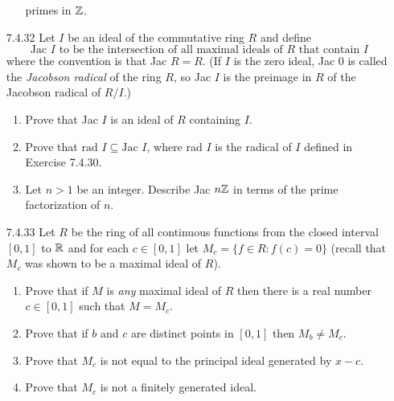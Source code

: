 \begin{enumerate}
\begin{enumerate}
                           primes in $\mathbb{Z}$.
                  \end{enumerate}
   \item[7.4.32]  Let $I$ be an ideal of the commutative ring $R$ and define
                  $$\text{Jac $I$ to be the intersection of all maximal ideals
                     of $R$ that contain $I$}$$
                  where the convention is that Jac $R = R$. (If $I$ is the zero
                  ideal, Jac 0 is called the \textit{Jacobson radical} of the
                  ring $R$, so Jac $I$ is the preimage in $R$ of the Jacobson
                  radical of $R/I$.)
                  \begin{enumerate}
                     \item Prove that Jac $I$ is an ideal of $R$ containing $I$.
                     \item Prove that $\text{rad } I \subseteq \text{Jac }I$,
                           where rad $I$ is the radical of $I$ defined in
                           Exercise 7.4.30.
                     \item Let $n > 1$ be an integer. Describe Jac $n\mathbb{Z}$ in
                           terms of the prime factorization of $n$.
                  \end{enumerate}
   \item[7.4.33]  Let $R$ be the ring of all continuous functions from the
                  closed interval $[0, 1]$ to $\mathbb{R}$ and for each $c \in [0, 1]$
                  let $M_c = \{f \in R : f(c) = 0\}$ (recall that $M_c$ was
                  shown to be a maximal ideal of $R$).
                  \begin{enumerate}
                     \item Prove that if $M$ is \textit{any} maximal ideal of
                           $R$ then there is a real number $c \in [0, 1]$ such
                           that $M = M_c$.
                     \item Prove that if $b$ and $c$ are distinct points in
                           $[0, 1]$ then $M_b \neq M_c$.
                     \item Prove that $M_c$ is not equal to the principal ideal
                           generated by $x - c$.
                     \item Prove that $M_c$ is not a finitely generated ideal.
                  \end{enumerate}
\end{enumerate}


